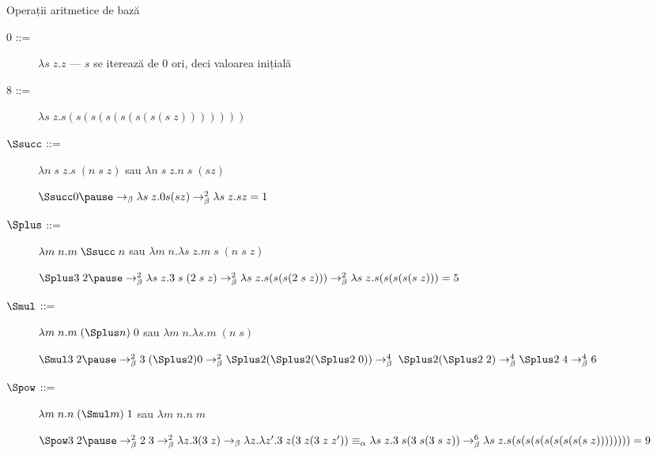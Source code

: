 \documentclass[xcolor=pdftex,romanian,colorlinks]{beamer}
\begin{document}
\begin{frame}{Operații aritmetice de bază}
\begin{description}
  \item[0 ::=] $\lambda s\; z. z$
      --- $s$ se iterează de 0 ori, deci valoarea inițială
  \item[8 ::=] $\lambda s\; z. s (s (s (s (s (s (s (s\; z)))))))$
  \item[$\Ssucc$ ::=] $\lambda n\; s\; z.s\; (n\; s\; z)$ sau  $\lambda n\; s\; z.n\; s\; (s z)$
    
  $\Ssucc 0 \pause \rightarrow_\beta \lambda s\; z.0 s (s z) \rightarrow^2_\beta
    \lambda s\; z. s z
    = 1
  $
  \item[$\Splus$ ::=] $\lambda m\; n. m\; \Ssucc\; n$ sau $\lambda m\; n.\lambda s\; z.m\; s\; (n\; s\; z)$

  $\Splus 3\; 2 \pause \rightarrow^2_\beta \lambda s\; z.3\; s\; (2\; s\; z) \rightarrow^2_\beta \lambda s\; z. s (s (s (2\; s\; z))) \rightarrow^2_\beta
    \lambda s\; z. s (s (s (s (s\; z)))
    = 5
    $
  \item[$\Smul$ ::=] $\lambda m\; n. m\; (\Splus n)\; 0$ sau $\lambda m\; n.\lambda s.m\; (n\; s)$

  $\Smul 3\; 2 \pause \rightarrow^2_\beta 3\; (\Splus 2) 0 \rightarrow^2_\beta
    \Splus 2 (\Splus 2 (\Splus 2\; 0)) \rightarrow^4_\beta$ 
    $\Splus 2 (\Splus 2\; 2)  \rightarrow^4_\beta
     \Splus 2\; 4  \rightarrow^4_\beta 6$

  \item[$\Spow$ ::=] $\lambda m\; n. n\; (\Smul m)\; 1$ sau $\lambda m\; n.n\; m$

  $\Spow 3\; 2 \pause \rightarrow^2_\beta 2\; 3 \rightarrow^2_\beta
    \lambda z.3 (3\; z) \rightarrow_\beta
     \lambda z.\lambda z'.3\; z (3\; z (3\; z\; z')) \equiv_\alpha
     \lambda s\; z.3\; s (3\; s (3\; s\; z)) \rightarrow^6_\beta
     \lambda s\; z.s ( s ( s (s ( s ( s (s (s (s \; z))))))))
     = 9
  $
\end{description}
\end{frame}
\end{document}
